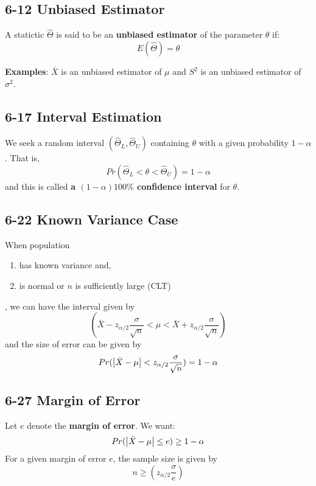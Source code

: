 \documentclass[12pt,landscape]{article}
\begin{document}
\begin{multicols}{3}
    \subsection{6-12 Unbiased Estimator}
    A statictic $\hat{\Theta}$ is said to be an \textbf{unbiased estimator} of the parameter $\theta$ if:
        $$ E(\hat{\Theta}) = \theta $$
    
    \textbf{Examples}:
    $\bar{X}$ is an unbiased estimator of $\mu$ and $S^2$ is an unbiased estimator of $\sigma^2$.

    \subsection{6-17 Interval Estimation}
    We seek a random interval $(\hat{\Theta}_L, \hat{\Theta}_U)$ containing $\theta$ with a given probability
    $1 - \alpha$. That is,
        $$ Pr(\hat{\Theta}_L < \theta < \hat{\Theta}_U) = 1-\alpha $$
    and this is called \textbf{a $(1-\alpha)100\%$ confidence interval} for $\theta$.

    \subsection{6-22 Known Variance Case}
    \label{6-22}
    When population
    \begin{enumerate}
        \item has known variance and,
        \item is normal or $n$ is sufficiently large (CLT)
    \end{enumerate}
    , we can have the interval given by
        $$ (\bar{X} - z_{\alpha/2} \frac{\sigma}{\sqrt{n}} < \mu < \bar{X} + z_{\alpha/2} \frac{\sigma}{\sqrt{n}}) $$
    and the size of error can be given by
        $$ Pr(\abs{\bar{X} - \mu} < z_{\alpha/2} \frac{\sigma}{\sqrt{n}}) = 1 - \alpha $$

    \subsection{6-27 Margin of Error}
    \label{6-27}
    Let $e$ denote the \textbf{margin of error}. We want:
        $$ Pr(\abs{\bar{X} - \mu} \leq e) \geq 1 - \alpha $$
    For a given margin of error $e$, the sample size is given by
        $$ n \geq (z_{\alpha/2} \frac{\sigma}{e}) $$


\end{multicols}
\end{document}
